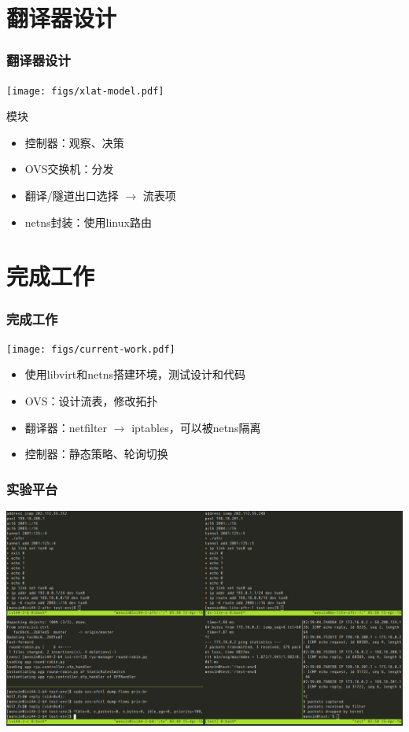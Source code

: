 \documentclass{beamer}
\begin{document}
\section{翻译器设计}
\begin{frame}
  \frametitle{翻译器设计}

  \begin{center}
    \texttt{[image: figs/xlat-model.pdf]}  
  \end{center}
  \begin{block}{模块}
    \begin{itemize}
    \item 控制器：观察、决策
    \item OVS交换机：分发
    \item 翻译/隧道出口选择 $\rightarrow$ 流表项
    \item netns封装：使用linux路由
    \end{itemize}
  \end{block}
\end{frame}

\section{完成工作}
\begin{frame}
  \frametitle{完成工作}

  \begin{center}
    \texttt{[image: figs/current-work.pdf]}  
  \end{center}
  
  \begin{block}{}
    \begin{itemize}
    \item 使用libvirt和netns搭建环境，测试设计和代码
    \item OVS：设计流表，修改拓扑
    \item 翻译器：netfilter $\rightarrow$ iptables，可以被netns隔离
    \item 控制器：静态策略、轮询切换
    \end{itemize}
  \end{block}
\end{frame}

\begin{frame}
  \frametitle{实验平台}

  \begin{center}
    \includegraphics[width=\textwidth]{figs/test-env.jpeg}
  \end{center}
\end{frame}
\end{document}
